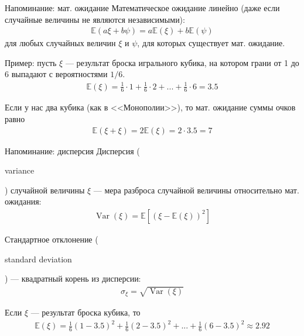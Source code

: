 \documentclass{beamer}
\newcommand{\en}[1]{\begin{otherlanguage}{english}#1\end{otherlanguage}}
\begin{document}
\begin{frame}{Напоминание: мат. ожидание}
\justify
Математическое ожидание линейно (даже если случайные величины не являются независимыми):
\begin{align*}
\mathbb{E}(a\xi + b\psi) = a\mathbb{E}(\xi) + b\mathbb{E}(\psi)
\end{align*}
для любых случайных величин $\xi$ и $\psi$, для которых существует мат. ожидание.

\justify
Пример: пусть $\xi$ --- результат броска игрального кубика, на котором грани от 1 до 6 выпадают с вероятностями $1/6$.
\begin{align*}
\mathbb{E}(\xi) = \frac{1}{6} \cdot 1 + \frac{1}{6} \cdot 2 + ... + \frac{1}{6} \cdot 6 = 3.5
\end{align*}

\justify
Если у нас два кубика (как в <<Монополии>>), то мат. ожидание суммы очков равно
\begin{align*}
\mathbb{E}(\xi + \xi) = 2\mathbb{E}(\xi) = 2 \cdot 3.5 = 7
\end{align*}
\end{frame}



\begin{frame}{Напоминание: дисперсия}
\justify
\alert{Дисперсия} (\en{variance}) случайной величины $\xi$ --- мера разброса случайной величины относительно мат. ожидания:
\begin{align*}
\operatorname{Var}(\xi) = \mathbb{E}[(\xi - \mathbb{E}(\xi))^2]
\end{align*}

\justify
\alert{Стандартное отклонение} (\en{standard deviation}) --- квадратный корень из дисперсии:
\begin{align*}
\sigma_{\xi} = \sqrt{\operatorname{Var}(\xi)}
\end{align*}

\justify
Если $\xi$ --- результат броска кубика, то
\begin{align*}
\mathbb{E}(\xi) = \frac{1}{6}(1 - 3.5)^2 + \frac{1}{6}(2 - 3.5)^2 + ... + \frac{1}{6}(6-3.5)^2 \approx 2.92
\end{align*}
\end{frame}
\end{document}
